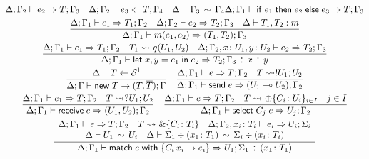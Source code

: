 \begin{figure}[h!]
\begin{gather*}
{      \algtypeout[\kindEnv;\varEnv_2]{e_2}{T}{\varEnv_3}
      \quad
      \algtypein[\kindEnv;\varEnv_2]{e_3}{T}{\varEnv_4}
      \quad
      \ctxequiv{\varEnv_3}{\varEnv_4}
    }{
      \algtypeout[\kindEnv;\varEnv_1]{\conditionale{e_1}{e_2}{e_3}}{T}{\varEnv_3}
    }
    \\
    \frac{
      \algtypeout[\kindEnv ; \varEnv_1]{e_1}{T_1}{\varEnv_2}
      \quad
      \algtypeout[\kindEnv ; \varEnv_2]{e_2}{T_2}{\varEnv_3}
      \quad
      \isType{T_1,T_2}{m}
    }{
      \algtypeout[\kindEnv ; \varEnv_1]{m(e_1, e_2)}{(T_1,T_2)}{\varEnv_3}
    }
    \\
    \frac{
      \algtypeout[\kindEnv ; \varEnv_1]{e_1}{T_1}{\varEnv_2}
      \quad
      T_1 \Extract{} q(U_1, U_2)
      \quad
      \algtypeout[\kindEnv; \varEnv_2, x\colon U_1, y\colon U_2]{e_2}{T_2}{\varEnv_3}
    }{
      \algtypeout[\kindEnv;
      \varEnv_1]{\binlete{x}{y}{e_1}{e_2}}{T_2}{\varEnv_3} \div x \div y
    }
    \\
    \frac{
      \kindEnv \Alg T \leftarrow \kinds^{\Lin}
    }{
      \kindEnv;\varEnv \Alg \newe{T} \rightarrow (T, \dual{T}); \varEnv
    }
    \quad
    \frac{
      \algtypeout[\kindEnv;\varEnv_1]{e}{T}{\varEnv_2}
      \quad
      T\Extract{} !U_1;U_2
    }{
      \algtypeout[\kindEnv;\varEnv_1]{\sendce e}{(U_1\multimap U_2)}{\varEnv_2}
    }
    \\
    \frac{
      \algtypeout[\kindEnv;\varEnv_1]{e_1}{T}{\varEnv_2}
      \quad T
      \Extract{} ?U_1;U_2
    }{
      \algtypeout[\kindEnv;\varEnv_1]{\recve e}{(U_1,U_2)}{\varEnv_2}
    }
    \quad
    \frac{
      \algtypeout[\kindEnv;\varEnv_1]{e}{T}{\varEnv_2}
      \quad
      T \Extract{}\oplus\{C_i\colon U_i\}_{i\in I}
      \quad
      j \in I
    }{
      \algtypeout[\kindEnv;\varEnv_1]{\selecte{C_j}{e}}{U_j}{\varEnv_2}
    }
    \\
    \frac{
      \begin{array}{c}
      \algtypeout[\kindEnv;\varEnv_1]{e}{T}{\varEnv_2}
      \quad
      T \Extract{} \&\{C_i\colon T_i\}
      \quad 
      \algtypeout[\kindEnv;\varEnv_2, x_i\colon T_i]{e_i}{U_i}{\Sigma_i}
      \\
      \typeequiv{U_1}{U_i}
      \quad
      \ctxequiv{\Sigma_1 \div (x_1\colon T_1)}{\Sigma_i \div (x_i\colon T_i)} 
      \end{array}
    }{
      \algtypeout[\kindEnv;\varEnv_1]{\matche{e}{\{C_i\,x_i
          \rightarrow e_i\}}}{U_1}{\Sigma_1 \div (x_1\colon T_1)}
}
\end{gather*}
\end{figure}
